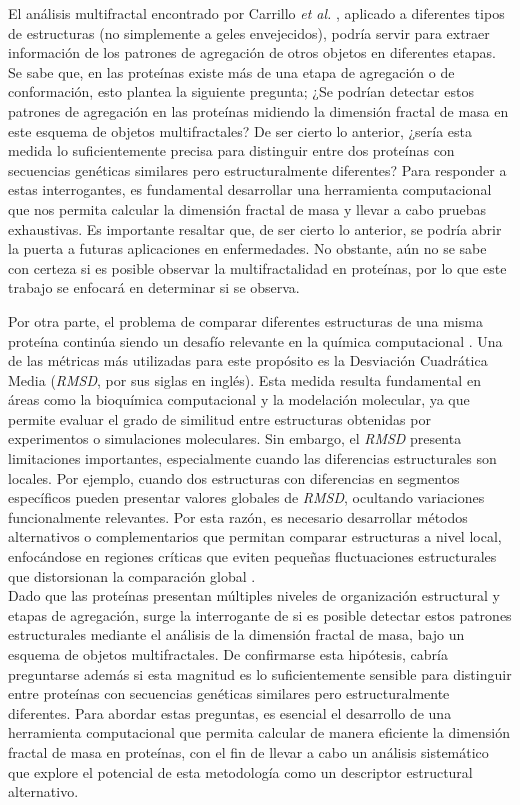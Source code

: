 El an\'{a}lisis multifractal encontrado por Carrillo \textit{et al.} \cite{Carrillo2003}, aplicado a diferentes tipos de estructuras (no simplemente a geles envejecidos), podr\'{i}a servir para extraer informaci\'{o}n de los patrones de agregaci\'{o}n de otros objetos en diferentes etapas. Se sabe que, en las prote\'{i}nas existe m\'{a}s de una etapa de agregaci\'{o}n o de conformaci\'{o}n, esto plantea la siguiente pregunta; ¿Se podr\'{i}an detectar estos patrones de agregaci\'{o}n en las prote\'{i}nas midiendo la dimensi\'{o}n fractal de masa en este esquema de objetos multifractales? De ser cierto lo anterior, ¿ser\'{i}a esta medida lo suficientemente precisa para distinguir entre dos prote\'{i}nas con secuencias gen\'{e}ticas similares pero estructuralmente diferentes? Para responder a estas interrogantes, es fundamental desarrollar una herramienta computacional que nos permita calcular la dimensi\'{o}n fractal de masa y llevar a cabo pruebas exhaustivas. Es importante resaltar que, de ser cierto lo anterior, se podr\'{i}a abrir la puerta a futuras aplicaciones en enfermedades. No obstante, a\'{u}n no se sabe con certeza si es posible observar la multifractalidad en prote\'{i}nas, por lo que este trabajo se enfocar\'{a} en determinar si se observa.


\clearpage

Por otra parte, el problema de comparar diferentes estructuras de una misma proteína continúa siendo un desafío relevante en la química computacional \cite{Kufareva2012}. Una de las métricas más utilizadas para este propósito es la Desviación Cuadrática Media (\textit{RMSD}, por sus siglas en inglés). Esta medida resulta fundamental en áreas como la bioquímica computacional y la modelación molecular, ya que permite evaluar el grado de similitud entre estructuras obtenidas por experimentos o simulaciones moleculares. Sin embargo, el \textit{RMSD} presenta limitaciones importantes, especialmente cuando las diferencias estructurales son locales. Por ejemplo, cuando dos estructuras con diferencias en segmentos específicos pueden presentar valores globales de \textit{RMSD}, ocultando variaciones funcionalmente relevantes. Por esta razón, es necesario desarrollar métodos alternativos o complementarios que permitan comparar estructuras a nivel local, enfocándose en regiones críticas que eviten pequeñas fluctuaciones estructurales que distorsionan la comparación global \cite{Kufareva2012}.\\

Dado que las proteínas presentan múltiples niveles de organización estructural y etapas de agregación, surge la interrogante de si es posible detectar estos patrones estructurales mediante el análisis de la dimensión fractal de masa, bajo un esquema de objetos multifractales. De confirmarse esta hipótesis, cabría preguntarse además si esta magnitud es lo suficientemente sensible para distinguir entre proteínas con secuencias genéticas similares pero estructuralmente diferentes. Para abordar estas preguntas, es esencial el desarrollo de una herramienta computacional que permita calcular de manera eficiente la dimensión fractal de masa en proteínas, con el fin de llevar a cabo un análisis sistemático que explore el potencial de esta metodología como un descriptor estructural alternativo.
